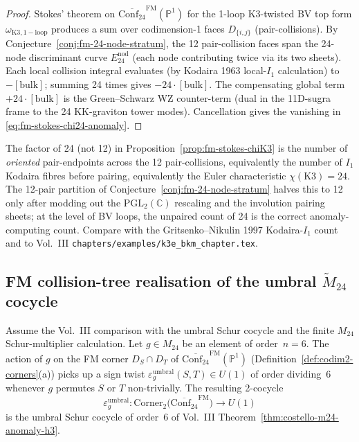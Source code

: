 \begin{proof}
Stokes' theorem on
$\overline{\mathrm{Conf}_{24}}^{\mathrm{FM}}(\mathbb{P}^1)$ for
the 1-loop K3-twisted BV top form $\omega_{\mathrm{K3,1-loop}}$
produces a sum over codimension-1 faces $D_{\{i,j\}}$
(pair-collisions). By
Conjecture~\ref{conj:fm-24-node-stratum}, the 12 pair-collision
faces span the 24-node discriminant curve $E^{\mathrm{nod}}_{24}$
(each node contributing twice via its two sheets). Each local
collision integral evaluates (by Kodaira 1963 local-$I_1$
calculation) to $-[\mathrm{bulk}]$; summing 24 times gives
$-24\cdot[\mathrm{bulk}]$. The compensating global term
$+24\cdot[\mathrm{bulk}]$ is the Green--Schwarz WZ counter-term
(dual in the 11D-sugra frame to the 24 KK-graviton tower
modes). Cancellation gives the vanishing in
\eqref{eq:fm-stokes-chi24-anomaly}.
\end{proof}

\begin{remark}
\label{rem:fm-double-counting}
The factor of 24 (not 12) in
Proposition~\ref{prop:fm-stokes-chiK3} is the number of
\emph{oriented} pair-endpoints across the 12 pair-collisions,
equivalently the number of $I_1$ Kodaira fibres before pairing,
equivalently the Euler characteristic
$\chi(\mathrm{K3}) = 24$. The 12-pair partition of
Conjecture~\ref{conj:fm-24-node-stratum} halves this to 12
only after modding out the $\mathrm{PGL}_2(\mathbb{C})$ rescaling
and the involution pairing sheets; at the level of BV loops, the
unpaired count of 24 is the correct anomaly-computing count.
Compare with the Gritsenko--Nikulin 1997 Kodaira-$I_1$
count and to Vol.~III \texttt{chapters/examples/k3e\_bkm\_chapter.tex}.
\end{remark}

\subsection{FM collision-tree realisation of the umbral
$\widetilde M_{24}$ cocycle}
\label{subsec:fm-umbral-Z6}

\begin{proposition}
\label{prop:fm-umbral-z6-sign}
Assume the Vol.~III comparison with the umbral Schur cocycle and the
finite $M_{24}$ Schur-multiplier calculation. Let $g\in M_{24}$ be an
element of order~$n=6$. The action of $g$
on the FM corner $D_S\cap D_T$ of
$\overline{\mathrm{Conf}_{24}}^{\mathrm{FM}}(\mathbb{P}^1)$
(Definition~\ref{def:codim2-corners}(a)) picks up a sign twist
$\varepsilon_g^{\mathrm{umbral}}(S,T)\in U(1)$ of order
dividing~$6$ whenever $g$ permutes $S$ or $T$ non-trivially. The
resulting 2-cocycle
\begin{equation}
\label{eq:fm-Z6-cocycle}
\varepsilon_g^{\mathrm{umbral}}\colon
\mathrm{Corner}_2\bigl(\overline{\mathrm{Conf}_{24}}^{\mathrm{FM}}\bigr)
\longrightarrow U(1)
\end{equation}
is the umbral Schur cocycle of order~$6$ of
Vol.~III Theorem~\ref{thm:costello-m24-anomaly-h3}.
\end{proposition}

